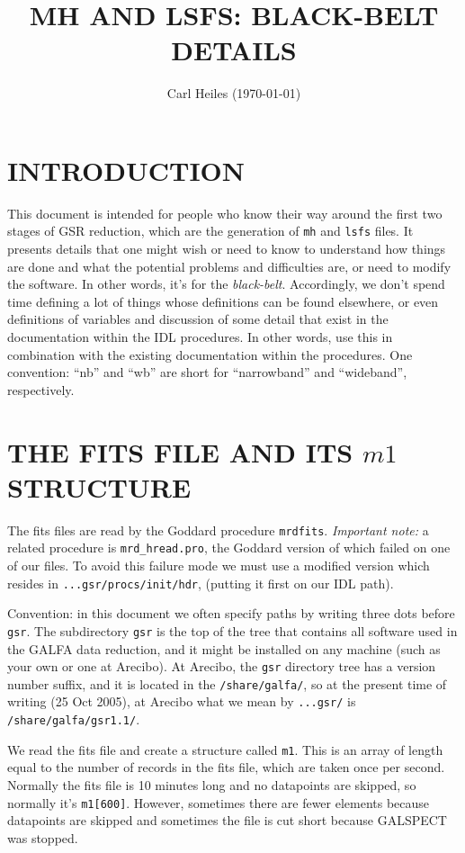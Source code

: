 \documentclass[psfig,preprint]{aastex}
\begin{document}
                                                                                
\title{MH AND LSFS: BLACK-BELT DETAILS}

\author{Carl Heiles (\today)}

\tableofcontents

\section{INTRODUCTION}

	This document is intended for people who know their way around
the first two stages of GSR reduction, which are the generation of
\verb$mh$ and \verb$lsfs$ files. It presents details that one might wish
or need to know to understand how things are done and what the potential
problems and difficulties are, or need to modify the software. In other
words, it's for the {\it black-belt}. Accordingly, we don't  spend time
defining a lot of things whose definitions can be found elsewhere, or
even definitions of variables and discussion of some detail that exist
in the documentation within the IDL procedures. In other words, use this
in combination with the existing documentation within the procedures.
One convention: ``nb'' and ``wb'' are short for ``narrowband'' and
``wideband'', respectively.

\section{THE FITS FILE AND ITS $m1$ STRUCTURE} \label{fitsfile}

	The fits files are read by the Goddard procedure \verb$mrdfits$. 
{\it Important note:} a related procedure is \verb$mrd_hread.pro$, the
Goddard version of which failed on one of our files.  To avoid this
failure mode we must use a modified version which resides in
\verb$...gsr/procs/init/hdr$, (putting it first on our IDL path). 

	Convention: in this document we often specify paths by writing
three dots before \verb$gsr$.  The subdirectory \verb$gsr$ is the top of
the tree that contains all software used in the GALFA data reduction,
and it might be installed on any machine (such as your own or one at
Arecibo).  At Arecibo, the \verb$gsr$ directory tree has a version
number suffix, and it is located in the \verb$/share/galfa/$, so at the
present time of writing (25 Oct 2005), at Arecibo what we mean by
\verb$...gsr/$ is \verb$/share/galfa/gsr1.1/$. 

	We read the fits file and create a structure called \verb$m1$. 
This is an array of length equal to the number of records in the fits
file, which are taken once per second.  Normally the fits file is 10
minutes long and no datapoints are skipped, so normally it's
\verb$m1[600]$.  However, sometimes there are fewer elements because
datapoints are skipped and sometimes the file is cut short because
GALSPECT was stopped. 
\end{document}
